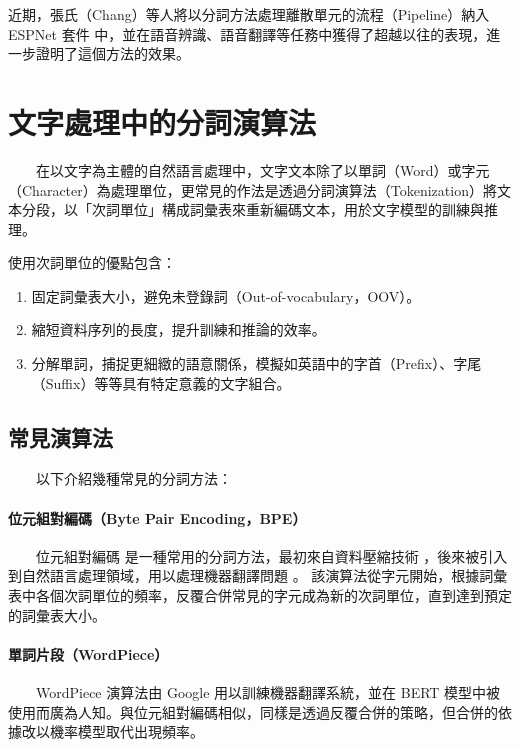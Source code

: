         近期，張氏（Chang）等人\cite{chang_exploring_2024}將以分詞方法處理離散單元的流程（Pipeline）納入 ESPNet 套件 \cite{watanabe2018espnet} 中，並在語音辨識、語音翻譯等任務中獲得了超越以往的表現，進一步證明了這個方法的效果。

\section{文字處理中的分詞演算法}

　　在以文字為主體的自然語言處理中，文字文本除了以單詞（Word）或字元（Character）為處理單位，更常見的作法是透過分詞演算法（Tokenization）將文本分段，以「次詞單位」構成詞彙表來重新編碼文本，用於文字模型的訓練與推理。

        使用次詞單位的優點包含：

\begin{enumerate}
    \item 固定詞彙表大小，避免未登錄詞（Out-of-vocabulary，OOV）。
    \item 縮短資料序列的長度，提升訓練和推論的效率。
    \item 分解單詞，捕捉更細緻的語意關係，模擬如英語中的字首（Prefix）、字尾（Suffix）等等具有特定意義的文字組合。
\end{enumerate}

\subsection{常見演算法}

　　以下介紹幾種常見的分詞方法：

\paragraph{位元組對編碼（Byte Pair Encoding，BPE）} \hfill \break
%
　　位元組對編碼 \cite{10.5555/177910.177914, sennrich_neural_2016} 是一種常用的分詞方法，最初來自資料壓縮技術 \cite{10.5555/177910.177914}，後來被引入到自然語言處理領域，用以處理機器翻譯問題 \cite{sennrich_neural_2016} 。
該演算法從字元開始，根據詞彙表中各個次詞單位的頻率，反覆合併常見的字元成為新的次詞單位，直到達到預定的詞彙表大小。

\paragraph{單詞片段（WordPiece）} \hfill \break
%
　　WordPiece \cite{wu2016google} 演算法由 Google 用以訓練機器翻譯系統，並在 BERT \cite{devlin_bert_2019} 模型中被使用而廣為人知。與位元組對編碼相似，同樣是透過反覆合併的策略，但合併的依據改以機率模型取代出現頻率。

